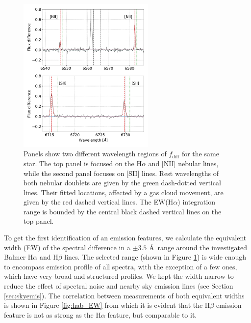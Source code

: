 \begin{figure}
	\centering
	\includegraphics[width=0.6\textwidth]{paper_180131002701292_1.pdf}
	\caption{Panels show two different wavelength regions of $f_\mathrm{diff}$ for the same star. The top panel is focused on the H$\alpha$ and [NII] nebular lines, while the second panel focuses on [SII] lines. Rest wavelengths of both nebular doublets are given by the green dash-dotted vertical lines. Their fitted locations, affected by a gas cloud movement, are given by the red dashed vertical lines. The EW(H$\alpha$) integration range is bounded by the central black dashed vertical lines on the top panel.}
	\label{fig:emissfit}
\end{figure}

To get the first identification of an emission features, we calculate the equivalent width (EW) of the spectral difference in a $\pm3.5$ \AA\ range around the investigated Balmer H$\alpha$ and H$\beta$ lines. The selected range (shown in Figure \ref{fig:emissfit}) is wide enough to encompass emission profile of all spectra, with the exception of a few ones, which have very broad and structured profiles. We kept the width narrow to reduce the effect of spectral noise and nearby sky emission lines (see Section \ref{sec:skyemis}). The correlation between measurements of both equivalent widths is shown in Figure \ref{fig:hab_EW} from which it is evident that the H$\beta$ emission feature is not as strong as the H$\alpha$ feature, but comparable to it.

